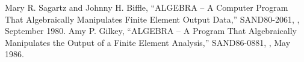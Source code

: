 \setlength{\itemsep}{\bigskipamount}
\begin{thebibliography}{99}
%
Mary R. Sagartz and Johnny H. Biffle,
``ALGEBRA -- A Computer Program That Algebraically Manipulates Finite Element
Output Data,''
SAND80-2061, \SNLA, September 1980.
%
Amy P. Gilkey,
``ALGEBRA -- A Program That Algebraically Manipulates
the Output of a Finite Element Analysis,''
SAND86-0881, \SNLA, May 1986.
%

%

%

%

%

%

%
\end{thebibliography}
